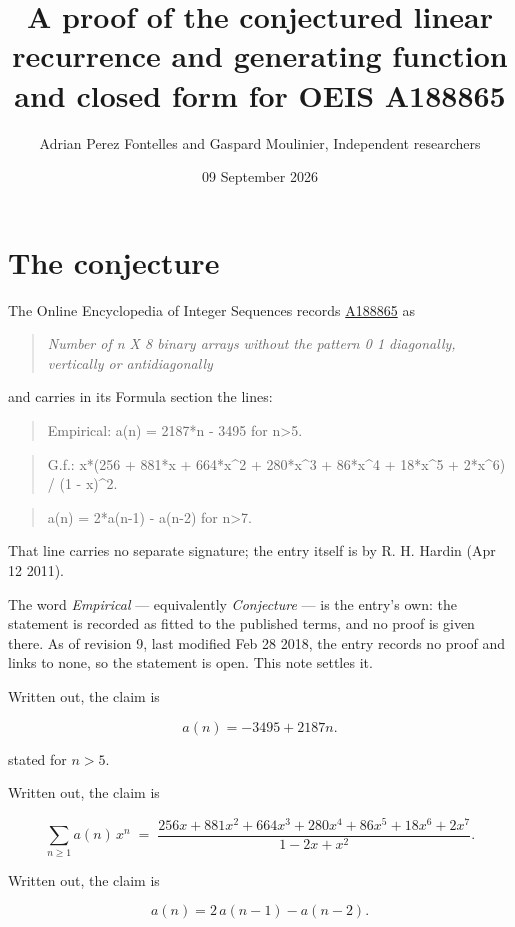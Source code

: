 \documentclass[11pt]{article}
\title{A proof of the conjectured linear recurrence and generating function and closed form for OEIS A188865}
\author{Adrian Perez Fontelles and Gaspard Moulinier, Independent researchers}
\date{09 September 2026}
\theoremstyle{definition}
\begin{document}
\maketitle
\section{The conjecture}

The Online Encyclopedia of Integer Sequences records \href{https://oeis.org/A188865}{A188865} as

\begin{quote}\itshape Number of n X 8 binary arrays without the pattern 0 1 diagonally, vertically or antidiagonally\end{quote}

and carries in its Formula section the lines:

\begin{quote}\ttfamily Empirical: a(n) = 2187*n - 3495 for n>5.\end{quote}

\begin{quote}\ttfamily G.f.: x*(256 + 881*x + 664*x\textasciicircum{}2 + 280*x\textasciicircum{}3 + 86*x\textasciicircum{}4 + 18*x\textasciicircum{}5 + 2*x\textasciicircum{}6) / (1 - x)\textasciicircum{}2.\end{quote}

\begin{quote}\ttfamily a(n) = 2*a(n-1) - a(n-2) for n>7.\end{quote}

That line carries no separate signature; the entry itself is by R. H. Hardin (Apr 12 2011).

The word {\itshape Empirical} --- equivalently {\itshape Conjecture} --- is the entry's own: the statement is recorded as fitted to the published terms, and no proof is given there. As of revision 9, last modified Feb 28 2018, the entry records no proof and links to none, so the statement is open. This note settles it.

Written out, the claim is

\[a(n) = -3495 + 2187n.\]

stated for $n > 5$.

Written out, the claim is

\[\sum_{n \ge 1} a(n)\,x^n \;=\; \frac{256x + 881x^{2} + 664x^{3} + 280x^{4} + 86x^{5} + 18x^{6} + 2x^{7}}{1 - 2x + x^{2}}.\]

Written out, the claim is

\[a(n) = 2\,a(n-1) - a(n-2).\]
\end{document}
